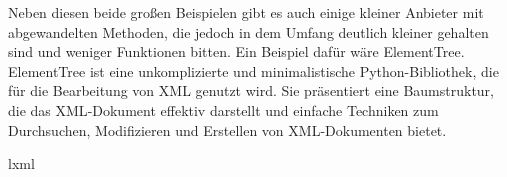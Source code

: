 Neben diesen beide großen Beispielen gibt es auch einige kleiner Anbieter mit abgewandelten Methoden,
die jedoch in dem Umfang deutlich kleiner gehalten sind und weniger Funktionen bitten.
Ein Beispiel dafür wäre ElementTree.
ElementTree ist eine unkomplizierte und minimalistische Python-Bibliothek, die für die Bearbeitung von \ac{XML} genutzt wird.
Sie präsentiert eine Baumstruktur, die das \ac{XML}-Dokument effektiv darstellt und einfache Techniken zum Durchsuchen,
Modifizieren und Erstellen von \ac{XML}-Dokumenten bietet.\cite*{ElementTree2025}

lxml
\pagebreak